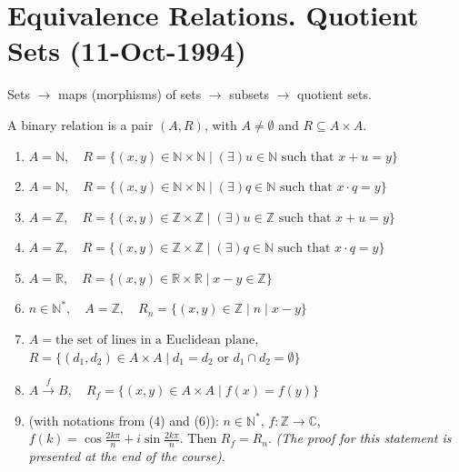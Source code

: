 
\section{Equivalence Relations. Quotient Sets (11-Oct-1994)}

Sets $\rightarrow$ maps (morphisms) of sets $\rightarrow$ subsets $\rightarrow$ quotient sets.

\begin{definition}
A binary relation is a pair $(A, R)$, with $A \neq \emptyset$ and $R \subseteq A \times A$.
\end{definition}

\begin{example}
\begin{enumerate}
    \item[(1)] $A = \mathbb{N}, \quad R = \{(x, y) \in \mathbb{N} \times \mathbb{N} \mid (\exists) u \in \mathbb{N} \text{ such that } x + u = y\}$
    \item[(2)] $A = \mathbb{N}, \quad R = \{(x, y) \in \mathbb{N} \times \mathbb{N} \mid (\exists) q \in \mathbb{N} \text{ such that } x \cdot q = y\}$
    \item[(1)'] $A = \mathbb{Z}, \quad R = \{(x, y) \in \mathbb{Z} \times \mathbb{Z} \mid (\exists) u \in \mathbb{Z} \text{ such that } x + u = y\}$
    \item[(2)'] $A = \mathbb{Z}, \quad R = \{(x, y) \in \mathbb{Z} \times \mathbb{Z} \mid (\exists) q \in \mathbb{N} \text{ such that } x \cdot q = y\}$
    \item[(3)] $A = \mathbb{R}, \quad R = \{(x, y) \in \mathbb{R} \times \mathbb{R} \mid x - y \in \mathbb{Z}\}$
    \item[(4)] $n \in \mathbb{N}^*, \quad A = \mathbb{Z}, \quad R_n = \{(x, y) \in \mathbb{Z} \mid n \mid x - y \}$
    \item[(5)] $A = \text{the set of lines in a Euclidean plane}$, \\ $R = \{(d_1, d_2) \in A \times A \mid d_1 = d_2 \text{ or } d_1 \cap d_2 = \emptyset\}$
    \item[(6)] $A \xrightarrow{f} B, \quad R_f = \{(x, y) \in A \times A \mid f(x) = f(y)\}$
    \item[(7)] (with notations from (4) and (6)): $n \in \mathbb{N}^*$, $f: \mathbb{Z} \rightarrow \mathbb{C}$, $f(k) = \cos \frac{2k\pi}{n} + i \sin \frac{2k\pi}{n}$. Then $R_f = R_n$. \textit{(The proof for this statement is presented at the end of the course).}
\end{enumerate}
\end{example}

